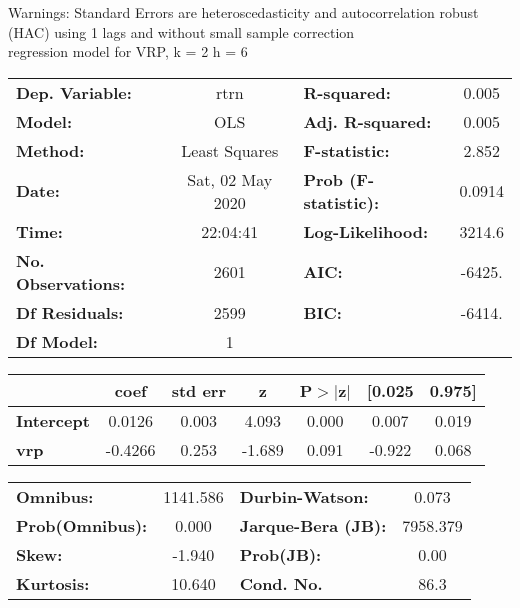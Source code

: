 Warnings: \newline
 [1] Standard Errors are heteroscedasticity and autocorrelation robust (HAC) using 1 lags and without small sample correction\\ 

regression model for VRP, k = 2 h = 6\begin{center}
\begin{tabular}{lclc}
\toprule
\textbf{Dep. Variable:}    &       rtrn       & \textbf{  R-squared:         } &     0.005   \\
\textbf{Model:}            &       OLS        & \textbf{  Adj. R-squared:    } &     0.005   \\
\textbf{Method:}           &  Least Squares   & \textbf{  F-statistic:       } &     2.852   \\
\textbf{Date:}             & Sat, 02 May 2020 & \textbf{  Prob (F-statistic):} &   0.0914    \\
\textbf{Time:}             &     22:04:41     & \textbf{  Log-Likelihood:    } &    3214.6   \\
\textbf{No. Observations:} &        2601      & \textbf{  AIC:               } &    -6425.   \\
\textbf{Df Residuals:}     &        2599      & \textbf{  BIC:               } &    -6414.   \\
\textbf{Df Model:}         &           1      & \textbf{                     } &             \\
\bottomrule
\end{tabular}
\begin{tabular}{lcccccc}
                   & \textbf{coef} & \textbf{std err} & \textbf{z} & \textbf{P$> |$z$|$} & \textbf{[0.025} & \textbf{0.975]}  \\
\midrule
\textbf{Intercept} &       0.0126  &        0.003     &     4.093  &         0.000        &        0.007    &        0.019     \\
\textbf{vrp}       &      -0.4266  &        0.253     &    -1.689  &         0.091        &       -0.922    &        0.068     \\
\bottomrule
\end{tabular}
\begin{tabular}{lclc}
\textbf{Omnibus:}       & 1141.586 & \textbf{  Durbin-Watson:     } &    0.073  \\
\textbf{Prob(Omnibus):} &   0.000  & \textbf{  Jarque-Bera (JB):  } & 7958.379  \\
\textbf{Skew:}          &  -1.940  & \textbf{  Prob(JB):          } &     0.00  \\
\textbf{Kurtosis:}      &  10.640  & \textbf{  Cond. No.          } &     86.3  \\
\bottomrule
\end{tabular}
\end{center}

